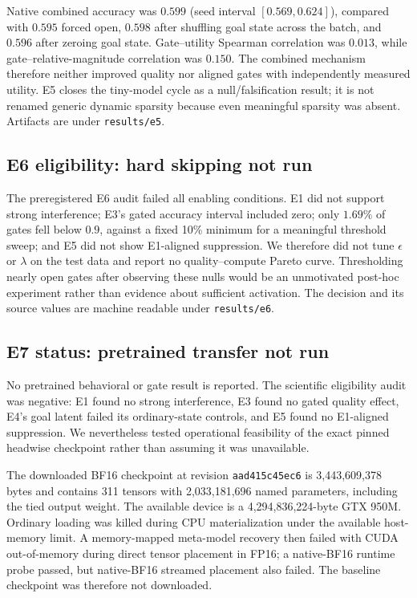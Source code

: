 \documentclass[10pt]{article}
\begin{document}
Native combined accuracy was $0.599$ (seed interval $[0.569,0.624]$), compared with $0.595$ forced open, $0.598$ after shuffling goal state across the batch, and $0.596$ after zeroing goal state. Gate--utility Spearman correlation was $0.013$, while gate--relative-magnitude correlation was $0.150$. The combined mechanism therefore neither improved quality nor aligned gates with independently measured utility. E5 closes the tiny-model cycle as a null/falsification result; it is not renamed generic dynamic sparsity because even meaningful sparsity was absent. Artifacts are under \texttt{results/e5}.

\subsection{E6 eligibility: hard skipping not run}
The preregistered E6 audit failed all enabling conditions. E1 did not support strong interference; E3's gated accuracy interval included zero; only $1.69\%$ of gates fell below $0.9$, against a fixed 10\% minimum for a meaningful threshold sweep; and E5 did not show E1-aligned suppression. We therefore did not tune $\epsilon$ or $\lambda$ on the test data and report no quality--compute Pareto curve. Thresholding nearly open gates after observing these nulls would be an unmotivated post-hoc experiment rather than evidence about sufficient activation. The decision and its source values are machine readable under \texttt{results/e6}.

\subsection{E7 status: pretrained transfer not run}
No pretrained behavioral or gate result is reported. The scientific eligibility audit was negative: E1 found no strong interference, E3 found no gated quality effect, E4's goal latent failed its ordinary-state controls, and E5 found no E1-aligned suppression. We nevertheless tested operational feasibility of the exact pinned headwise checkpoint rather than assuming it was unavailable.

The downloaded BF16 checkpoint at revision \texttt{aad415c45ec6} is 3,443,609,378 bytes and contains 311 tensors with 2,033,181,696 named parameters, including the tied output weight. The available device is a 4,294,836,224-byte GTX 950M. Ordinary loading was killed during CPU materialization under the available host-memory limit. A memory-mapped meta-model recovery then failed with CUDA out-of-memory during direct tensor placement in FP16; a native-BF16 runtime probe passed, but native-BF16 streamed placement also failed. The baseline checkpoint was therefore not downloaded.
\end{document}
